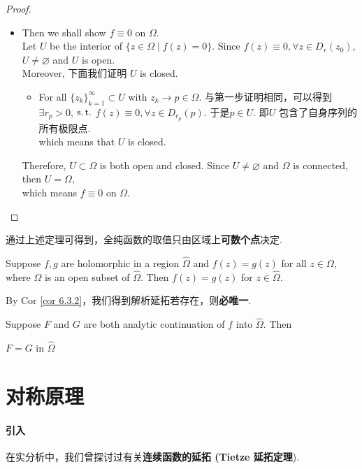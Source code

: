\begin{thm}
\begin{proof}
\begin{itemize}
				\item Then we shall show $f \equiv 0$ on $\Omega$. \\
				Let $U$ be the interior of $\{ z \in \Omega \mid f(z) = 0 \}$. Since $f(z) \equiv 0 , \forall z \in D_{r}(z_0)$, $U \neq \varnothing$ and $U$ is open. \\
				Moreover, 下面我们证明 $U$ is closed.
				\begin{itemize}
					\item For all $\{ z_k \}_{k = 1}^{\infty} \subset U$ with $z_k \to p \in \Omega$. 与第一步证明相同，可以得到\\
					$\exists r_p > 0$, $\operatorname{s.t.}$ $f(z) \equiv 0 , \forall z \in D_{r_p}(p)$. 于是$p \in U$. 即$U$ 包含了自身序列的所有极限点. \\
					which means that $U$ is closed.
				\end{itemize}
				Therefore, $U \subset \Omega$ is both open and closed. Since $U \neq \varnothing$ and $\Omega$ is connected, then $U = \Omega$, \\
				which means $f \equiv 0$ on $\Omega$.
			\end{itemize}
		\end{proof}
	\end{thm}
	
	\vspace{2em}
	通过上述定理可得到，全纯函数的取值只由区域上\textbf{可数个点}决定.
	\begin{corollary}\label{cor 6.3.2}
		Suppose $f , g$ are holomorphic in a region $\hat{\Omega}$ and $f(z) = g(z)$ for all $z \in \Omega$, where $\Omega$ is an open subset of $\hat{\Omega}$. Then $f(z) = g(z)$ for $z \in \hat{\Omega}$.
	\end{corollary}

	\vspace{2em}
	By Cor \ref{cor 6.3.2}，我们得到解析延拓若存在，则\textbf{必唯一}.
	\begin{corollary}\label{cor 3.3.3}
		Suppose $F$ and $G$ are both analytic continuation of $f$ into $\hat{\Omega}$. Then
		\begin{center}
			$F = G$ in $\hat{\Omega}$
		\end{center}
	\end{corollary}

\newpage

\section{对称原理}
\paragraph{引入}
	在实分析中，我们曾探讨过有关\textbf{连续函数的延拓 (Tietze 延拓定理}). 
	
